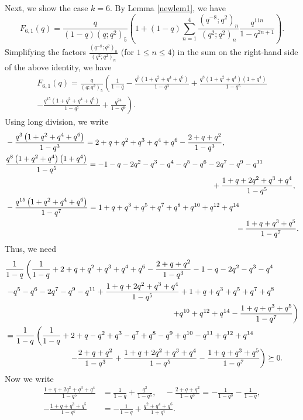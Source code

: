 \documentclass[12pt,reqno]{amsart}
\renewcommand{\(}{\left\(}
\renewcommand{\)}{\right\)}
\numberwithin{equation}{section}
\theoremstyle{plain}
\theoremstyle{definition}
\numberwithin{equation}{section}
\begin{document}
Next, we show the case $k=6$. By Lemma \ref{newlem1}, we have
\begin{equation*}
F_{6,1}(q)  = \frac{q}{(1-q)(q;q^2)_5}\left(1+(1-q)\sum_{n=1}^4 \frac{\left(q^{-8};q^2\right)_n}{(q^2;q^2)_n} \frac{q^{11n}}{1-q^{2n+1}}\right).
\end{equation*}
Simplifying the factors $\frac{(q^{-8};q^2)_n}{(q^2;q^2)_n}$ (for $1\le n\le 4$) in the sum on the right-hand side of the above identity, we have
\begin{multline*}
F_{6,1}(q) = \frac{q}{(q;q^2)_5} \left(\frac{1}{1-q} - \frac{q^3\left(1+q^2+q^4+q^6\right)}{1-q^3} + \frac{q^8\left(1+q^2+q^4\right)\left(1+q^4\right)}{1-q^5}\right.\\
\left.- \frac{q^{15}\left(1+q^2+q^4+q^6\right)}{1-q^7} + \frac{q^{24}}{1-q^9}\right).
\end{multline*}
Using long division, we write
\begin{align*}
&-\frac{q^3 \left(1+q^2+q^4+q^6\right)}{1-q^3} =  2+q+q^2+q^3+q^4+q^6-\frac{2+q+q^2}{1-q^3},\\
&\frac{q^8\left(1+q^2+q^4\right)\left(1+q^4\right)}{1-q^5}=   -1-q-2q^2-q^3-q^4-q^5-q^6-2q^7-q^9-q^{11}\\
&\hspace{9.5 cm}+\frac{1+q+2q^2+q^3+q^4}{1-q^5},\\
& - \frac{q^{15} \left(1+q^2+q^4+q^6\right)}{1-q^7}   =   1+q+q^3+q^5+q^7+q^8+q^{10}+q^{12}+q^{14} \\
&\hspace{10.6 cm}- \frac{1+q+q^3+q^5}{1-q^7}.
\end{align*}
Thus, we need
\begin{align*}
&\frac{1}{1-q} \left(\frac{1}{1-q}+2+q+q^2+q^3+q^4+q^6- \frac{2+q+q^2}{1-q^3}  - 1-q-2q^2-q^3-q^4  \right.\\
&\left.  -q^5-q^6-2q^7-q^9-q^{11} + \frac{1+q+2q^2+q^3+q^4}{1-q^5} +1+q+q^3+q^5+q^7+q^8 \right.\\
&\hspace{7.4 cm}\left. +q^{10}+q^{12}+q^{14}- \frac{1+q+q^3+q^5}{1-q^7}\right)\\
&= \frac{1}{1-q} \left(\frac{1}{1-q} + 2+q-q^2+q^3-q^7+q^8-q^9+q^{10}-q^{11}+q^{12}+q^{14} \right.\\
&\hspace{2.85cm}\left. -  \frac{2+q+q^2}{1-q^3}  +\frac{1+q+2q^2+q^3+q^4}{1-q^5}  - \frac{1+q+q^3+q^5}{1-q^7} \right) \succeq 0.
\end{align*}
Now we write 
\begin{align*}
\frac{1+q+2q^2+q^3+q^4}{1-q^5} &= \frac{1}{1-q} + \frac{q^2}{1-q^5}, \quad
-\frac{2+q+q^2}{1-q^3} = -\frac{1}{1-q^3} - \frac{1}{1-q},\\
- \frac{1+q+q^3+q^5}{1-q^7} &= - \frac{1}{1-q} + \frac{q^2+q^4+q^6}{1+q^7}.
\end{align*}
\end{document}
